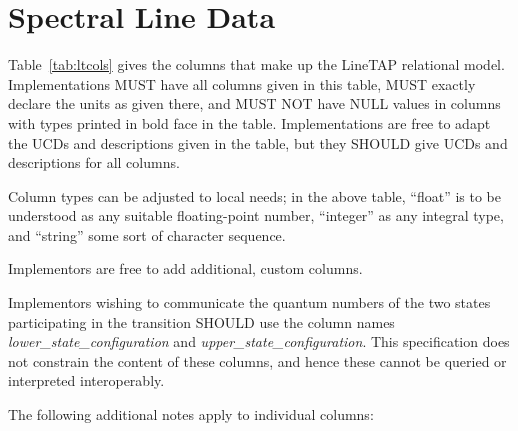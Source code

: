 \documentclass[11pt,a4paper]{ivoa}
\begin{document}
\section{Spectral Line Data}\label{sect:quantities}

Table~\ref{tab:ltcols} gives the columns that make up the LineTAP
relational model.  Implementations MUST have all columns given in this
table, MUST exactly declare the units as given there, and MUST NOT have
NULL values in columns with types printed in bold face in the table.
Implementations are free to adapt the UCDs and descriptions given in the
table, but they SHOULD give UCDs and descriptions for all columns.

Column types can be adjusted to local needs; in the
above table, ``float'' is to be understood as any suitable
floating-point number, ``integer'' as any integral type, and ``string''
some sort of character sequence.

Implementors are free to add additional, custom columns.

Implementors wishing to communicate the quantum numbers of the two
states participating in the transition SHOULD use the column names
\textit{lower\_state\_configuration} and 
\textit{upper\_state\_configuration}.  This specification does not
constrain the content of these columns, and hence these cannot be
queried or interpreted interoperably.

The following additional notes apply to individual columns:
\end{document}
